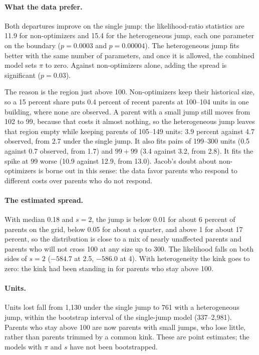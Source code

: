 \paragraph{What the data prefer.} Both departures improve on the single jump:
the likelihood-ratio statistics are 11.9 for non-optimizers and 15.4 for the
heterogeneous jump, each one parameter on the boundary ($p=0.0003$ and
$p=0.00004$). The heterogeneous jump fits better with the same number of
parameters, and once it is allowed, the combined model sets $\pi$ to zero.
Against non-optimizers alone, adding the spread is significant ($p=0.03$).

The reason is the region just above 100. Non-optimizers keep their historical
size, so a 15 percent share puts 0.4 percent of recent parents at 100--104
units in one building, where none are observed. A parent with a small jump
still moves from 102 to 99, because that costs it almost nothing, so the
heterogeneous jump leaves that region empty while keeping parents of 105--149
units: 3.9 percent against 4.7 observed, from 2.7 under the single jump. It
also fits pairs of 199--300 units (0.5 against 0.7 observed, from 1.7) and
$99+99$ (3.4 against 3.2, from 2.8). It fits the spike at 99 worse (10.9
against 12.9, from 13.0). Jacob's doubt about non-optimizers is borne out in
this sense: the data favor parents who respond to different costs over
parents who do not respond.

\paragraph{The estimated spread.} With median 0.18 and $s=2$, the jump is
below 0.01 for about 6 percent of parents on the grid, below 0.05 for about a
quarter, and above 1 for about 17 percent, so the distribution is close to a
mix of nearly unaffected parents and parents who will not cross 100 at any
size up to 300. The likelihood falls on both sides of $s=2$ ($-584.7$ at 2.5,
$-586.0$ at 4). With heterogeneity the kink goes to zero: the kink had been
standing in for parents who stay above 100.

\paragraph{Units.} Units lost fall from 1,130 under the single jump to 761
with a heterogeneous jump, within the bootstrap interval of the single-jump
model (337--2,981). Parents who stay above 100 are now parents with small
jumps, who lose little, rather than parents trimmed by a common kink. These
are point estimates; the models with $\pi$ and $s$ have not been
bootstrapped.

